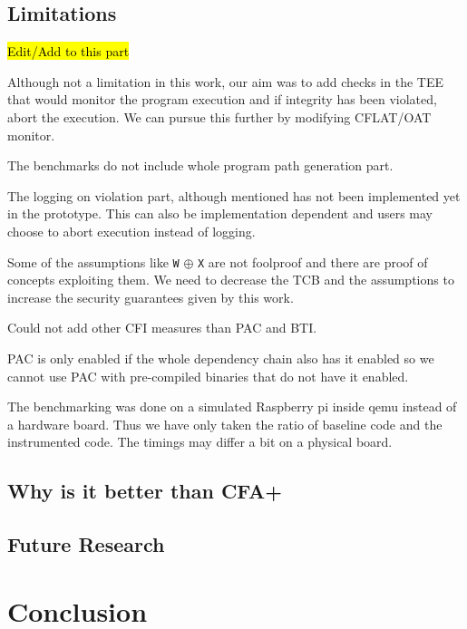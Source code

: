 \documentclass[a4paper, nobind]{templates/ociamthesis}
\begin{document}
\minitoc 

\section{Limitations}\label{limitations-2}

\hl{Edit/Add to this part}

Although not a limitation in this work, our aim was to add checks in the TEE
that would monitor the program execution and if integrity has been violated,
abort the execution. We can pursue this further by modifying CFLAT/OAT monitor.

The benchmarks do not include whole program path generation part.

The logging on violation part, although mentioned has not been implemented yet
in the prototype. This can also be implementation dependent and users may choose
to abort execution instead of logging.

Some of the assumptions like \texttt{W} \(\oplus\) \texttt{X} are not foolproof and there are
proof of concepts exploiting them. We need to decrease the TCB and the
assumptions to increase the security guarantees given by this work.

Could not add other CFI measures than PAC and BTI.

PAC is only enabled if the whole dependency chain also has it enabled so we
cannot use PAC with pre-compiled binaries that do not have it enabled.

The benchmarking was done on a simulated Raspberry pi inside qemu instead of a
hardware board. Thus we have only taken the ratio of baseline code and the
instrumented code. The timings may differ a bit on a physical board.

\section{Why is it better than CFA+}\label{why-is-it-better-than-cfa}

\section{Future Research}\label{future-research}

\chapter*{Conclusion}\label{conclusion}
\end{document}
